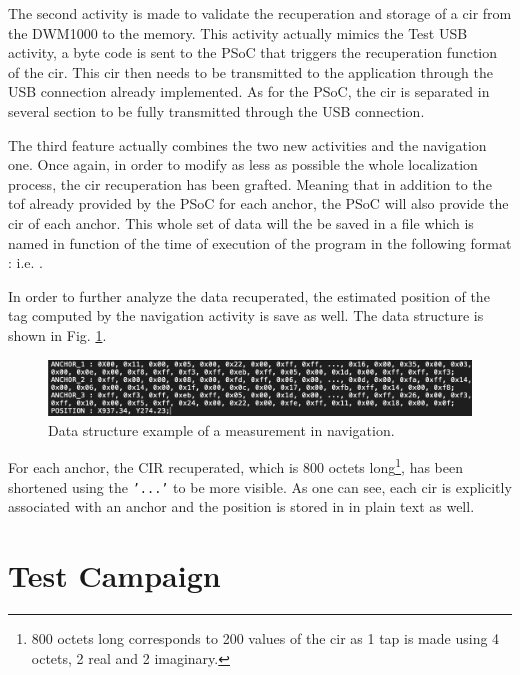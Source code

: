 The second activity is made to validate the recuperation and storage of a \gls{cir} from the DWM1000 to the memory. This activity actually mimics the Test USB activity, a byte code is sent to the PSoC that triggers the recuperation function of the \gls{cir}. This \gls{cir} then needs to be transmitted to the application through the USB connection already implemented. As for the PSoC, the \gls{cir} is separated in several section to be fully transmitted through the USB connection.
\vspace{2mm}

The third feature actually combines the two new activities and the navigation one. Once again, in order to modify as less as possible the whole localization process, the \gls{cir} recuperation has been grafted. Meaning that in addition to the \gls{tof} already provided by the PSoC for each anchor, the PSoC will also provide the \gls{cir} of each anchor. This whole set of data will the be saved in a  file which is named in function of the time of execution of the program in the following format :  i.e. .
\vspace{2mm}

In order to further analyze the data recuperated, the estimated position of the tag computed by the navigation activity is save as well. The data structure is shown in Fig. \ref{fig:saved_data}.

\begin{figure}[H]
\centering
\includegraphics[width=\linewidth]{Images/saved_cir.png}
\caption{Data structure example of a measurement in navigation. \label{fig:saved_data}}
\end{figure}

For each anchor, the CIR recuperated, which is 800 octets long\footnote{800 octets long corresponds to 200 values of the \gls{cir} as 1 tap is made using 4 octets, 2 real and 2 imaginary.}, has been shortened using the \texttt{'...'} to be more visible. As one can see, each \gls{cir} is explicitly associated with an anchor and the position is stored in  in plain text as well.

\section{Test Campaign}

